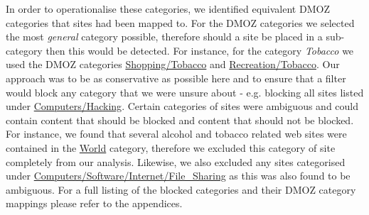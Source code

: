\documentclass{bmcart}
\begin{document}
In order to operationalise these categories, we identified equivalent DMOZ categories that sites had been mapped to.
For the DMOZ categories we selected the most \textit{general} category possible, therefore should a site be placed in a sub-category then this would be detected.
For instance, for the category \textit{Tobacco} we used the DMOZ categories \url{Shopping/Tobacco} and \url{Recreation/Tobacco}.
Our approach was to be as conservative as possible here and to ensure that a filter would block any category that we were unsure about - e.g. blocking all sites listed under \url{Computers/Hacking}.
Certain categories of sites were ambiguous and could contain content that should be blocked and content that should not be blocked.
For instance, we found that several alcohol and tobacco related web sites were contained in the \url{World} category, therefore we excluded this category of site completely from our analysis.
Likewise, we also excluded any sites categorised under \url{Computers/Software/Internet/File_Sharing} as this was also found to be ambiguous.
For a full listing of the blocked categories and their DMOZ category mappings please refer to the appendices.
\end{document}
